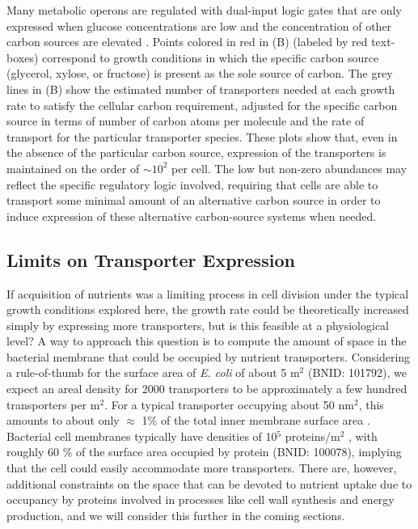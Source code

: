 Many metabolic operons are regulated with dual-input logic gates that are
only expressed when glucose concentrations are low and the concentration of
other carbon sources are elevated \citep{gama-castro2016, zhang2014a,
gama-castro2016, belliveau2018, ireland2020}. Points colored in red in
(B) (labeled by red text-boxes) correspond to growth
conditions in which the specific carbon source (glycerol, xylose, or
fructose) is present as the sole source of carbon. The grey lines in
(B) show the estimated number of transporters needed at
each growth rate to satisfy the cellular carbon requirement, adjusted for the
specific carbon source in terms of number of carbon atoms per molecule and
the rate of transport for the particular transporter species. These plots
show that, even in the absence of the particular carbon source, expression of the
transporters is maintained on the order of $\sim 10^2$ per cell. The low but
non-zero abundances may reflect the specific regulatory logic involved,
requiring that cells are able to transport some minimal amount of an
alternative carbon source in order to induce expression of these alternative
carbon-source systems when needed.

\subsection{Limits on Transporter Expression}
If acquisition of nutrients was a limiting process in cell division under the
typical growth conditions explored here, the growth rate could be theoretically
increased simply by expressing more transporters, but is this feasible at a
physiological level? A way to approach this question is to compute the amount of
space in the bacterial membrane that could be occupied by nutrient transporters.
Considering a rule-of-thumb for the surface area of \textit{E. coli} of about 5
\textmu m$^2$ (BNID: 101792), we expect an areal density for 2000 transporters
to be approximately a few hundred transporters per \textmu m$^2$. For a typical transporter
occupying about 50 nm$^2$, this amounts to about only $\approx$ 1\% of the total
inner membrane surface area \citep{szenk2017}. Bacterial cell membranes
typically have densities of 10$^5$ proteins/\textmu m$^2$ \citep{phillips2018},
with roughly 60 \% of the surface area occupied by protein (BNID: 100078),
implying that the cell could easily accommodate more transporters. There are,
however, additional constraints on the space that  can be devoted to nutrient
uptake due to occupancy by proteins involved in processes like cell wall
synthesis and energy production, and we will consider this further in the coming
sections.

